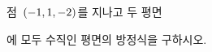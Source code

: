 점~$(-1{,}\mkern3mu\mathopen{}1{,}\mkern3mu\mathopen{}-2)$를 지나고 두 평면 \par\smallskip{}\par\smallskip\noindent 에 모두 수직인 평면의 방정식을 구하시오.
